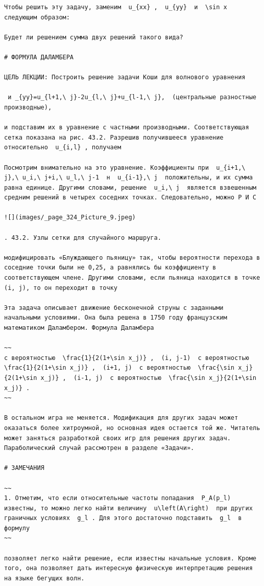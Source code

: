 \documentclass[
  ukrainian,
]{article}
\begin{document}
\begin{verbatim}
Чтобы решить эту задачу, заменим  u_{xx} ,  u_{yy}  и  \sin x  следующим образом:

Будет ли решением сумма двух решений такого вида?

# ФОРМУЛА ДАЛАМБЕРА

ЦЕЛЬ ЛЕКЦИИ: Построить решение задачи Коши для волнового уравнения

 и _{yy}=u_{l+1,\ j}-2u_{l,\ j}+u_{l-1,\ j},  (центральные разностные производные),

и подставим их в уравнение с частными производными. Соответствующая сетка показана на рис. 43.2. Разрешив получившееся уравнение относительно  u_{i,l} , получаем

Посмотрим внимательно на это уравнение. Коэффициенты при  u_{i+1,\ j},\ u_i,\ j+i,\ u_l,\ j-1  н  u_{i-1},\ j  положительны, и их сумма равна единице. Другими словами, решение  u_i,\ j  является взвешенным средним решений в четырех соседних точках. Следовательно, можно Р И С

![](images/_page_324_Picture_9.jpeg)

. 43.2. Узлы сетки для случайного маршруга.

модифицировать «Блуждающего пьяницу» так, чтобы вероятности перехода в соседние точки были не 0,25, а равнялись бы коэффициенту в соответствующем члене. Другими словами, если пьяница находится в точке (i, j), то он переходит в точку

Эта задача описывает движение бесконечной струны с заданными начальными условиями. Она была решена в 1750 году французским математиком Даламбером. Формула Даламбера

~~
с вероятностью  \frac{1}{2(1+\sin x_j)} ,  (i, j-1)  с вероятностью  \frac{1}{2(1+\sin x_j)} ,  (i+1, j)  с вероятностью  \frac{\sin x_j}{2(1+\sin x_j)} ,  (i-1, j)  с вероятностью  \frac{\sin x_j}{2(1+\sin x_j)} .
~~

В остальном игра не меняется. Модификация для других задач может оказаться более хитроумной, но основная идея остается той же. Читатель может заняться разработкой своих игр для решения других задач. Параболический случай рассмотрен в разделе «Задачи».

# ЗАМЕЧАНИЯ

~~
1. Отметим, что если относительные частоты попадания  P_A(p_l)  известны, то можно легко найти величину  u\left(A\right)  при других граничных условиях  g_l . Для этого достаточно подставить  g_l  в формулу
~~

позволяет легко найти решение, если известны начальные условия. Кроме того, она позволяет дать интересную физическую интерпретацию решения на языке бегущих волн.


\end{verbatim}
\end{document}
